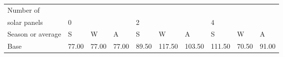 \begin{table}[h] 
\centering 
\begin{tabular}{l|lll|lll|lll}Number of \\ solar panels&0& & &2& & &4& & \\ \hline 
Season or average & S & W & A & S & W & A & S & W & A \\ \hline 
Base&77.00&77.00&77.00&89.50&117.50&103.50&111.50&70.50&91.00 \\ 
\end{tabular} 
\end{table}